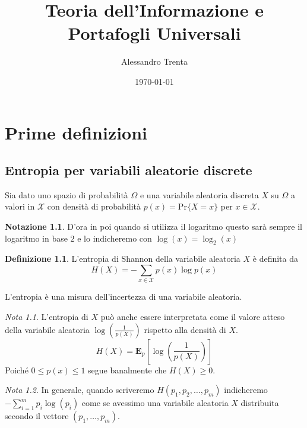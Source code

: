 \documentclass[a4paper,11pt]{book}
\title{Teoria dell'Informazione e Portafogli Universali}
\author{Alessandro Trenta}
\date{\today}
\theoremstyle{plain}
\theoremstyle{definition}
\newtheorem{defn}{Definizione}[chapter]
\newtheorem*{notaz}{Notazione}
\theoremstyle{remark}
\newtheorem*{nota}{Nota}
\begin{document}
\maketitle
\tableofcontents
\chapter{Prime definizioni}
\section{Entropia per variabili aleatorie discrete}
Sia dato uno spazio di probabilità $\Omega$ e una variabile aleatoria discreta $X$ su $\Omega$ a valori in $\mathcal{X}$ con densità di probabilità $p(x) = \text{Pr}\{X = x\}$ per $x\in \mathcal{X}$.
\begin{notaz}
	D'ora in poi quando si utilizza il logaritmo questo sarà sempre il logaritmo in base $2$ e lo indicheremo con $\log(x) = \log_{2}(x)$
\end{notaz}
\begin{defn}
	L'entropia di Shannon della variabile aleatoria $X$ è definita da
	\begin{equation*}
	H(X) = -\sum_{x\in \mathcal{X}}{p(x)\log p(x)}
	\end{equation*}
\end{defn}

L'entropia è una misura dell'incertezza di una variabile aleatoria.
\begin{nota}
	L'entropia di $X$ può anche essere interpretata come il valore atteso della variabile aleatoria $\log\left(\frac{1}{p(X)}\right)$ rispetto alla densità di $X$.
	\[
		H(X) = \mathbf{E}_{p}\left[\log\left(\frac{1}{p(X)}\right)\right]
	\]
	Poiché $0\leq p(x)\leq 1$ segue banalmente che $H(X)\geq 0$.
\end{nota}
\begin{nota}
	In generale, quando scriveremo $H(p_1,p_2,\ldots,p_m)$ indicheremo $-\sum_{i = 1}^{m}{p_i\log(p_i)}$ come se avessimo una variabile aleatoria $X$ distribuita secondo il vettore $(p_1,\ldots,p_m)$.
\end{nota}
\end{document}
